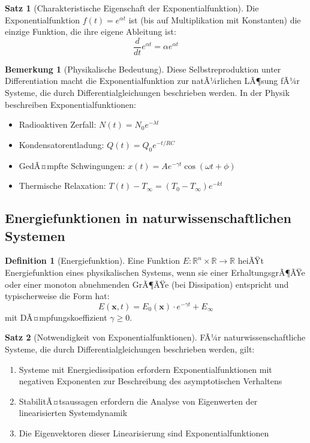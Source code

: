﻿\documentclass[a4paper,12pt]{report}
\theoremstyle{definition}
\newtheorem{definition}{Definition}[section]
\newtheorem{bemerkung}{Bemerkung}[section]
\newtheorem{satz}{Satz}[section]
\begin{document}
\begin{satz}[Charakteristische Eigenschaft der Exponentialfunktion]
	Die Exponentialfunktion $f(t) = e^{\alpha t}$ ist (bis auf Multiplikation mit Konstanten) die einzige Funktion, die ihre eigene Ableitung ist:
	\begin{equation}
		\frac{d}{dt} e^{\alpha t} = \alpha e^{\alpha t}
	\end{equation}
\end{satz}

\begin{bemerkung}[Physikalische Bedeutung]
	Diese Selbstreproduktion unter Differentiation macht die Exponentialfunktion zur natÃ¼rlichen LÃ¶sung fÃ¼r Systeme, die durch Differentialgleichungen beschrieben werden. In der Physik beschreiben Exponentialfunktionen:
	\begin{itemize}
		\item[-] Radioaktiven Zerfall: $N(t) = N_0 e^{-\lambda t}$
		\item[-] Kondensatorentladung: $Q(t) = Q_0 e^{-t/RC}$
		\item[-] GedÃ¤mpfte Schwingungen: $x(t) = A e^{-\gamma t} \cos(\omega t + \phi)$
		\item[-] Thermische Relaxation: $T(t) - T_{\infty} = (T_0 - T_{\infty}) e^{-kt}$
	\end{itemize}
\end{bemerkung}

\subsection{Energiefunktionen in naturwissenschaftlichen Systemen}

\begin{definition}[Energiefunktion]
	Eine Funktion $E: \mathbb{R}^n \times \mathbb{R} \to \mathbb{R}$ heiÃŸt Energiefunktion eines physikalischen Systems, wenn sie einer ErhaltungsgrÃ¶ÃŸe oder einer monoton abnehmenden GrÃ¶ÃŸe (bei Dissipation) entspricht und typischerweise die Form hat:
	\begin{equation}
		E(\mathbf{x}, t) = E_0(\mathbf{x}) \cdot e^{-\gamma t} + E_{\infty}
	\end{equation}
	mit DÃ¤mpfungskoeffizient $\gamma \geq 0$.
\end{definition}

\begin{satz}[Notwendigkeit von Exponentialfunktionen]
	FÃ¼r naturwissenschaftliche Systeme, die durch Differentialgleichungen beschrieben werden, gilt:
	\begin{enumerate}
		\item[-] Systeme mit Energiedissipation erfordern Exponentialfunktionen mit negativen Exponenten zur Beschreibung des asymptotischen Verhaltens
		\item[-] StabilitÃ¤tsaussagen erfordern die Analyse von Eigenwerten der linearisierten Systemdynamik
		\item[-] Die Eigenvektoren dieser Linearisierung sind Exponentialfunktionen
	\end{enumerate}
\end{satz}
\end{document}
